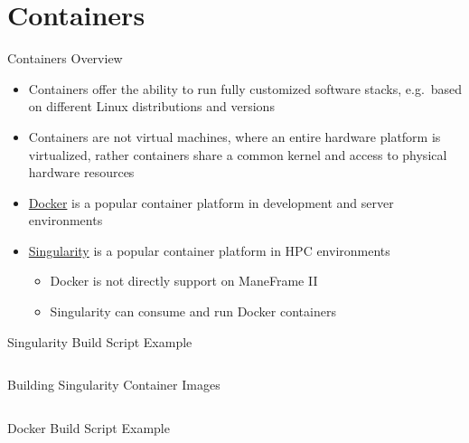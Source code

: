 \section{Containers}

\begin{frame}{Containers Overview}
\begin{itemize}
\item Containers offer the ability to run fully customized software stacks,
e.g.\ based on different Linux distributions and versions
\item Containers are not virtual machines, where an entire hardware platform is
virtualized, rather containers share a common kernel and access to physical
hardware resources
\item \href{https://www.docker.com}{Docker} is a popular container platform in
development and server environments
\item \href{https://sylabs.io}{Singularity} is a popular container platform in
HPC environments
\begin{itemize}
\item Docker is not directly support on ManeFrame II
\item Singularity can consume and run Docker containers
\end{itemize}
\end{itemize}
\end{frame}

\begin{frame}{Singularity Build Script Example}
\begin{listing}[H]
\inputminted{Singularity}{examples/python3.singularity}
\caption{Example Singularity build file that uses Ubuntu 18.04 and Python3 with
package installation via \texttt{apt} and \texttt{pip}.}
\end{listing}
\end{frame}

\begin{frame}{Building Singularity Container Images}
\begin{listing}[H]
\inputminted{sh}{examples/build_python3_singularity.sh}
\caption{Steps to build a Singularity container image. Note that building
Singularity container images from build scripts on M2 requires permission.
Request permission via \href{mailto:help@smu.edu}{help@smu.edu}.}
\end{listing}
\end{frame}

\begin{frame}{Docker Build Script Example}
\begin{listing}[H]
\inputminted{Dockerfile}{examples/python3.dockerfile}
\caption{Example Dockerfile that uses Ubuntu 18.04 and Python3 with package
installation via \texttt{apt} and \texttt{pip}.}
\end{listing}
\end{frame}

